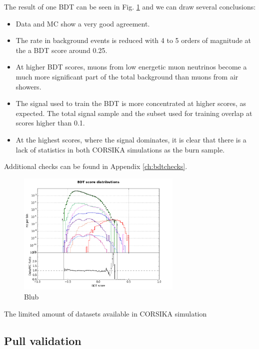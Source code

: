 \noindent The result of one BDT can be seen in Fig. \ref{fig:singlebdtrate} and we can draw several conclusions:
\vspace{2mm}
\begin{itemize}
\item Data and MC show a very good agreement.
\item The rate in background events is reduced with 4 to 5 orders of magnitude at the a BDT score around 0.25.
\item At higher BDT scores, muons from low energetic muon neutrinos become a much more significant part of the total background than muons from air showers.
\item The signal used to train the BDT is more concentrated at higher scores, as expected. The total signal sample and the subset used for training overlap at scores higher than 0.1.
\item At the highest scores, where the signal dominates, it is clear that there is a lack of statistics in both CORSIKA simulations as the burn sample.
\end{itemize}
\vspace{2mm}
Additional checks can be found in Appendix \ref{ch:bdtchecks}.

\begin{figure}
\centering
\includegraphics[width = 0.7\textwidth]{chapter8/img/dist_vs_bdt_result2_signal_m_100_charge1ovr2.png}
\caption{Blub}
\label{fig:singlebdtrate}
\end{figure}

\noindent The limited amount of datasets available in CORSIKA simulation 



\subsection{Pull validation}

